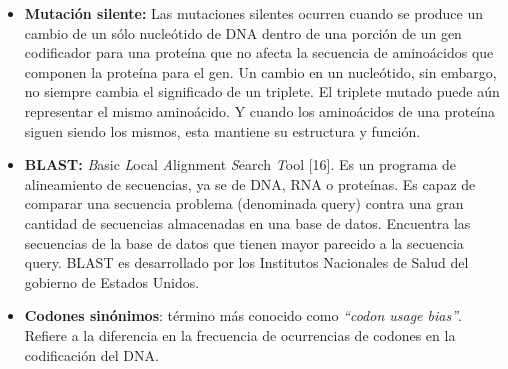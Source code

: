 \begin{itemize}
	\item \textbf{Mutación silente:} Las mutaciones silentes ocurren cuando se produce un cambio de un sólo nucleótido de DNA dentro de una porción de un 										gen codificador para una proteína que no afecta la secuencia de aminoácidos que componen la proteína para el gen. Un 										cambio en un nucleótido, sin embargo, no siempre cambia el significado de un triplete. El triplete mutado puede aún 									representar el mismo aminoácido. Y cuando los aminoácidos de una proteína siguen siendo los mismos, esta mantiene su 										estructura y función.				
	\item \textbf{BLAST:} \textit{B}asic \textit{L}ocal \textit{A}lignment \textit{S}earch \textit{T}ool [16]. Es un programa de alineamiento de 										secuencias, ya se de DNA, RNA o proteínas. Es capaz de comparar una secuencia problema (denominada query) contra una 										gran cantidad de secuencias almacenadas en una base de datos. Encuentra las secuencias de la base de datos que tienen 										mayor parecido a la secuencia query. BLAST es desarrollado por los Institutos Nacionales de Salud del gobierno de 										Estados Unidos.
	\item \textbf{Codones sinónimos}: término más conocido como \textit{``codon usage bias''}. Refiere a la diferencia en la frecuencia de ocurrencias de 										  codones en la codificación del DNA.


\end{itemize}

